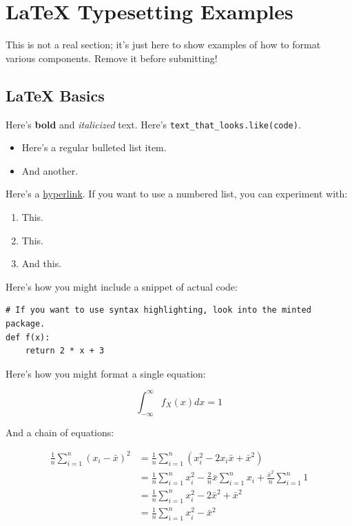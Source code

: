 \documentclass[12pt,letterpaper]{article}
\begin{document}
\section{\LaTeX{} Typesetting Examples}

{\color{blue} This is not a real section; it's just here to show examples of how to format various components. Remove it before submitting!}

\subsection{\LaTeX{} Basics}

Here's \textbf{bold} and \textit{italicized} text. Here's \texttt{text\_that\_looks.like(code)}.

\begin{itemize}
    \item Here's a regular bulleted list item.
    \item And another.
\end{itemize}

Here's a \href{https://datascience.ucsd.edu}{hyperlink}. If you want to use a numbered list, you can experiment with:

\begin{enumerate}
    \item This.
    \item This.
    \item And this.
\end{enumerate}

Here's how you might include a snippet of actual code:

\begin{verbatim}
# If you want to use syntax highlighting, look into the minted package.
def f(x):
    return 2 * x + 3
\end{verbatim}

Here's how you might format a single equation:

$$\int_{-\infty}^\infty f_X(x)dx = 1$$

And a chain of equations:

\begin{align*}
    \frac{1}{n}\sum_{i = 1}^n (x_i - \bar{x})^2 &= \frac{1}{n}\sum_{i = 1}^n (x_i^2 - 2x_i\bar{x} + \bar{x}^2)
    \\ &= \frac{1}{n}\sum_{i = 1}^n x_i^2 - \frac{2}{n}\bar{x}\sum_{i = 1}^n x_i + \frac{\bar{x}^2}{n}\sum_{i = 1}^n 1
    \\ &= \frac{1}{n}\sum_{i = 1}^n x_i^2 - 2\bar{x}^2 + \bar{x}^2
    \\ &= \frac{1}{n}\sum_{i = 1}^n x_i^2 - \bar{x}^2
\end{align*}
\end{document}
